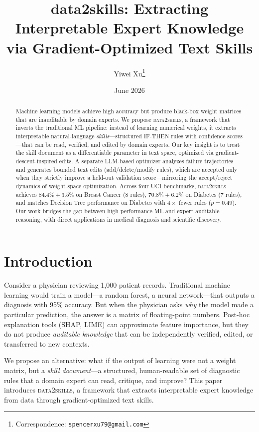 \documentclass{article}
\title{data2skills: Extracting Interpretable Expert Knowledge\\via Gradient-Optimized Text Skills}
\author[1,2]{Yiwei Xu\thanks{Correspondence: \texttt{spencerxu79@gmail.com}}}
\affil[1]{Institute of Applied Physics and Materials Engineering (IAPME), University of Macau}
\affil[2]{Songshan Lake Materials Laboratory, Dongguan, China}
\date{June 2026}
\begin{document}
\maketitle

\begin{abstract}
Machine learning models achieve high accuracy but produce black-box weight matrices that are inauditable by domain experts. 
We propose \textsc{data2skills}, a framework that inverts the traditional ML pipeline: instead of learning numerical weights, it extracts interpretable natural-language \emph{skills}---structured IF-THEN rules with confidence scores---that can be read, verified, and edited by domain experts. 
Our key insight is to treat the skill document as a differentiable parameter in text space, optimized via gradient-descent-inspired edits.
A separate LLM-based optimizer analyzes failure trajectories and generates bounded text edits (add/delete/modify rules), which are accepted only when they strictly improve a held-out validation score---mirroring the accept/reject dynamics of weight-space optimization.
Across four UCI benchmarks, \textsc{data2skills} achieves $84.4\% \pm 3.5\%$ on Breast Cancer (8 rules), $70.8\% \pm 6.2\%$ on Diabetes (7 rules), and matches Decision Tree performance on Diabetes with $4\times$ fewer rules ($p=0.49$).
Our work bridges the gap between high-performance ML and expert-auditable reasoning, with direct applications in medical diagnosis and scientific discovery.
\end{abstract}

\section{Introduction}

Consider a physician reviewing 1,000 patient records. 
Traditional machine learning would train a model---a random forest, a neural network---that outputs a diagnosis with 95\% accuracy. 
But when the physician asks \emph{why} the model made a particular prediction, the answer is a matrix of floating-point numbers. 
Post-hoc explanation tools (SHAP, LIME) can approximate feature importance, but they do not produce \emph{auditable knowledge} that can be independently verified, edited, or transferred to new contexts.

We propose an alternative: what if the output of learning were not a weight matrix, but a \emph{skill document}---a structured, human-readable set of diagnostic rules that a domain expert can read, critique, and improve?
This paper introduces \textsc{data2skills}, a framework that extracts interpretable expert knowledge from data through gradient-optimized text skills.
\end{document}
